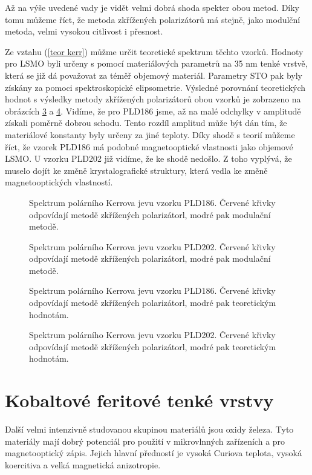 Až na výše uvedené vady je vidět velmi dobrá shoda spekter obou metod. Díky tomu můžeme říct, že metoda zkřížených polarizátorů má stejně, jako modulční metoda, velmi 
vysokou citlivost i přesnost.

Ze vztahu (\ref{teor kerr}) můžme určit teoretické spektrum těchto vzorků. Hodnoty pro LSMO byli určeny s pomocí materiálových parametrů na 35 nm tenké vrstvě, která 
se již dá považovat za téměř objemový materiál. \cite{PLD}  Parametry STO pak byly získány za pomoci spektroskopické elipsometrie. Výsledné porovnání 
teoretických hodnot s výsledky metody zkřížených polarizátorů obou 
vzorků je zobrazeno na obrázcích \ref{sPLD186t} a \ref{sPLD202t}. Vidíme, že pro PLD186 jsme, až na malé odchylky v amplitudě získali poměrně dobrou schodu. 
Tento rozdíl amplitud může být dán tím, že materiálové konstanty byly určeny za jiné teploty. Díky shodě s teorií můžeme říct, že vzorek PLD186 má podobné magnetooptické vlastnosti jako objemové LSMO. 
U vzorku PLD202 již vidíme, že ke shodě nedošlo. Z toho vyplývá, že muselo dojít ke změně krystalografické struktury, která vedla ke změně magnetooptických vlastností.

\begin{figure}

\caption{Spektrum polárního Kerrova jevu vzorku PLD186. Červené křivky odpovídají metodě zkřížených polarizátorl, modré pak modulační metodě.}
\label{sPLD186}
\end{figure}

\begin{figure}

\caption{Spektrum polárního Kerrova jevu vzorku PLD202. Červené křivky odpovídají metodě zkřížených polarizátorl, modré pak modulační metodě.}
\label{sPLD202}
\end{figure}

\begin{figure}

\caption{Spektrum polárního Kerrova jevu vzorku PLD186. Červené křivky odpovídají metodě zkřížených polarizátorl, modré pak teoretickým hodnotám.}
\label{sPLD186t}
\end{figure}

\begin{figure}

\caption{Spektrum polárního Kerrova jevu vzorku PLD202. Červené křivky odpovídají metodě zkřížených polarizátorl, modré pak teoretickým hodnotám.}
\label{sPLD202t}
\end{figure}
\section{Kobaltové feritové tenké vrstvy}
Další velmi intenzivně studovanou skupinou materiálů jsou oxidy železa.
Tyto materiály mají dobrý potenciál pro použití v mikrovlnných zařízeních a  pro magnetooptický zápis. 
Jejich hlavní předností je vysoká Curiova teplota, vysoká koercitiva a velká magnetická anizotropie. 

